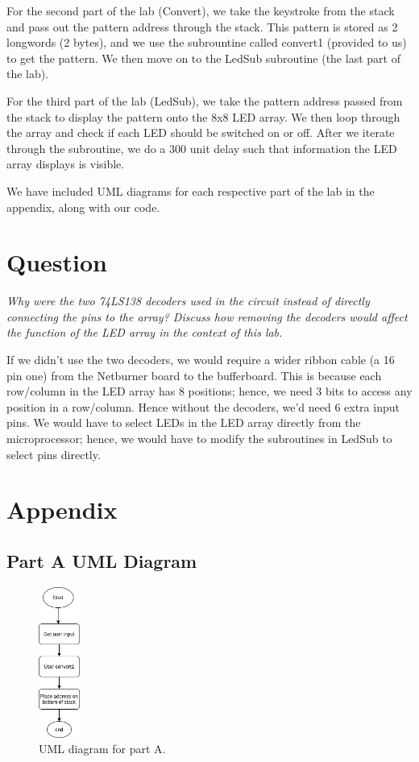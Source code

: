 \documentclass[10pt, letterpaper, titlepage]{article} %
\begin{document}
For the second part of the lab (Convert), we take the keystroke from the stack and pass out the pattern address through the stack. This pattern is stored as 2 longwords (2 bytes), and we use the subrountine called convert1 (provided to us) to get the pattern. We then move on to the LedSub subroutine (the last part of the lab).

For the third part of the lab (LedSub), we take the pattern address passed from the stack to display the pattern onto the 8x8 LED array. We then loop through the array and check if each LED should be switched on or off. After we iterate through the subroutine, we do a 300 unit delay such that information the LED array displays is visible.

We have included UML diagrams for each respective part of the lab in the appendix, along with our code.

\section{Question}

\textit{Why were the two 74LS138 decoders used in the circuit instead of directly connecting the pins to the
array? Discuss how removing the decoders would affect the function of the LED array in the context of this lab.}

If we didn't use the two decoders, we would require a wider ribbon cable (a 16 pin one) from the Netburner board to the bufferboard. This is because each row/column in the LED array has 8 positions; hence, we need 3 bits to access any position in a row/column. Hence without the decoders, we'd need 6 extra input pins. We would have to select LEDs in the LED array directly from the microprocessor; hence, we would have to modify the subroutines in LedSub to select pins directly.

\newpage

\section{Appendix}

\subsection{Part A UML Diagram}
\begin{figure}[H]
   \includegraphics[width=0.12\textwidth]{UML1.png}
   \centering  
   \caption{UML diagram for part A.} 
   \label{figure:1}
\end{figure}
\end{document}
